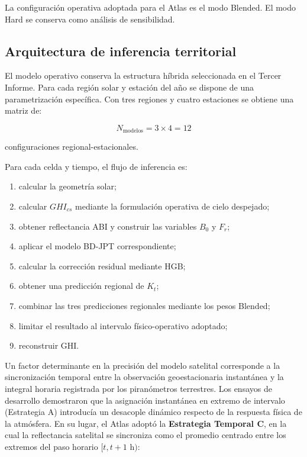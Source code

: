 \documentclass[11pt,a4paper]{article}
\begin{document}
La configuración operativa adoptada para el Atlas es el modo Blended. El modo Hard se conserva como análisis de sensibilidad.

\subsection{Arquitectura de inferencia territorial}

El modelo operativo conserva la estructura híbrida seleccionada en el Tercer Informe. Para cada región solar y estación del año se dispone de una parametrización específica. Con tres regiones y cuatro estaciones se obtiene una matriz de:

\[
N_{\text{modelos}}=3\times4=12
\]

configuraciones regional-estacionales.

Para cada celda y tiempo, el flujo de inferencia es:

\begin{enumerate}[label=\arabic*)]
    \item calcular la geometría solar;
    \item calcular $GHI_{cs}$ mediante la formulación operativa de cielo despejado;
    \item obtener reflectancia ABI y construir las variables $B_0$ y $F_r$;
    \item aplicar el modelo BD-JPT correspondiente;
    \item calcular la corrección residual mediante HGB;
    \item obtener una predicción regional de $K_t$;
    \item combinar las tres predicciones regionales mediante los pesos Blended;
    \item limitar el resultado al intervalo físico-operativo adoptado;
    \item reconstruir GHI.
\end{enumerate}

Un factor determinante en la precisión del modelo satelital corresponde a la sincronización temporal entre la observación geoestacionaria instantánea y la integral horaria registrada por los piranómetros terrestres. Los ensayos de desarrollo demostraron que la asignación instantánea en extremo de intervalo (Estrategia A) introducía un desacople dinámico respecto de la respuesta física de la atmósfera. En su lugar, el Atlas adoptó la \textbf{Estrategia Temporal C}, en la cual la reflectancia satelital se sincroniza como el promedio centrado entre los extremos del paso horario $[t, t+1\text{ h})$:
\end{document}
